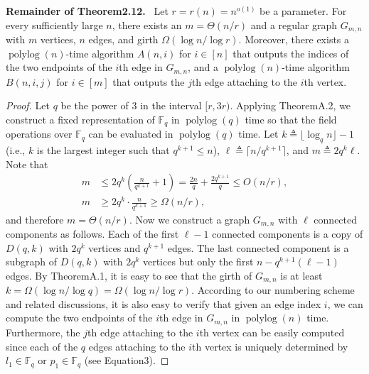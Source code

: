 \documentclass[10pt,a4paper]{article}
\newenvironment{authorclaim}[1]{\par\medskip\noindent\textbf{#1.}\ }{\par\medskip}
\begin{document}
\begin{authorclaim}{Remainder of Theorem2.12}
Let $r=r(n)=n^{o(1)}$ be a parameter. For every sufficiently large $n$, there exists an $m=\Theta(n/r)$ and a regular graph $G_{m,n}$ with $m$ vertices, $n$ edges, and girth $\Omega(\log n/\log r)$. Moreover, there exists a $\operatorname{polylog}(n)$-time algorithm $A(n,i)$ for $i\in[n]$ that outputs the indices of the two endpoints of the $i$th edge in $G_{m,n}$, and a $\operatorname{polylog}(n)$-time algorithm $B(n,i,j)$ for $i\in[m]$ that outputs the $j$th edge attaching to the $i$th vertex.
\end{authorclaim}
\begin{proof}
Let $q$ be the power of 3 in the interval $[r,3r)$. Applying TheoremA.2, we construct a fixed representation of $\mathbb F_q$ in $\operatorname{polylog}(q)$ time so that the field operations over $\mathbb F_q$ can be evaluated in $\operatorname{polylog}(q)$ time. Let $k\triangleq\lfloor\log_qn\rfloor-1$ (i.e., $k$ is the largest integer such that $q^{k+1}\le n$), $\ell\triangleq\lceil n/q^{k+1}\rceil$, and $m\triangleq2q^k\ell$. Note that
\begin{align*}
m&\le2q^k\left(\frac n{q^{k+1}}+1\right)=\frac{2n}q+\frac{2q^{k+1}}q\le O(n/r),\\
m&\ge2q^k\cdot\frac n{q^{k+1}}\ge\Omega(n/r),
\end{align*}
and therefore $m=\Theta(n/r)$. Now we construct a graph $G_{m,n}$ with $\ell$ connected components as follows. Each of the first $\ell-1$ connected components is a copy of $D(q,k)$ with $2q^k$ vertices and $q^{k+1}$ edges. The last connected component is a subgraph of $D(q,k)$ with $2q^k$ vertices but only the first $n-q^{k+1}(\ell-1)$ edges.
By TheoremA.1, it is easy to see that the girth of $G_{m,n}$ is at least $k=\Omega(\log n/\log q)=\Omega(\log n/\log r)$. According to our numbering scheme and related discussions, it is also easy to verify that given an edge index $i$, we can compute the two endpoints of the $i$th edge in $G_{m,n}$ in $\operatorname{polylog}(n)$ time. Furthermore, the $j$th edge attaching to the $i$th vertex can be easily computed since each of the $q$ edges attaching to the $i$th vertex is uniquely determined by $l_1\in\mathbb F_q$ or $p_1\in\mathbb F_q$ (see Equation3).
\end{proof}
\end{document}
